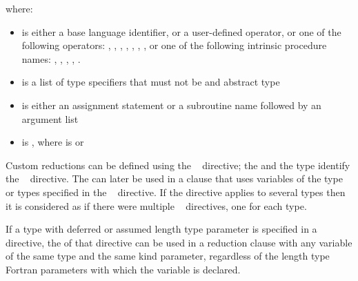 \begin{fortranspecific}

where:

\begin{itemize}
\item {} is either a base language identifier, or a 
      user-defined operator, or one of the following operators: \code{+}, \code{-},
      \code{*}, , , , , or one of 
      the following intrinsic procedure names: , , ,
      , .
\item {} is a list of type specifiers that must not be  
      and abstract type
\item {} is either an assignment statement or a subroutine name followed 
      by an argument list
\item {} is \code{)},
      where  is\linebreak
       or \code{(}\code{)}
\end{itemize}
\end{fortranspecific}

\descr
Custom reductions can be defined using the ~ 
directive; the  and the type identify the 
~ directive. The  can 
later be used in a  clause that uses variables of the type or types 
specified in the ~ directive. If the directive 
applies to several types then it is considered as if there were multiple 
~ directives, one for each type.

\begin{fortranspecific}
If a type with deferred or assumed length type parameter is specified in a 
~ directive, the  
of that directive can be used in a reduction clause with any variable of 
the same type and the same kind parameter, regardless of the length type 
Fortran parameters with which the variable is declared.
\end{fortranspecific}


